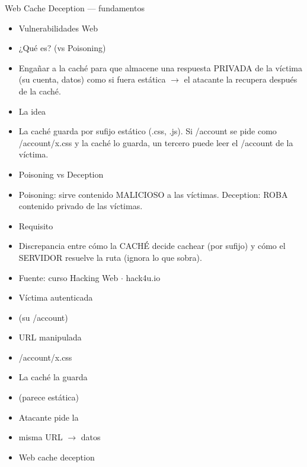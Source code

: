 \documentclass[aspectratio=169,10pt]{beamer}
\begin{document}
\begin{frame}[allowframebreaks]{Web Cache Deception --- fundamentos}
\small
  \begin{itemize}
  \item Vulnerabilidades Web
  \item ¿Qué es? (vs Poisoning)
  \item Engañar a la caché para que almacene una respuesta PRIVADA de la víctima (su cuenta, datos) como si fuera estática $\rightarrow$ el atacante la recupera después de la caché.
  \item La idea
  \item La caché guarda por sufijo estático (.css, .js). Si /account se pide como /account/x.css y la caché lo guarda, un tercero puede leer el /account de la víctima.
  \item Poisoning vs Deception
  \item Poisoning: sirve contenido MALICIOSO a las víctimas. Deception: ROBA contenido privado de las víctimas.
  \item Requisito
  \item Discrepancia entre cómo la CACHÉ decide cachear (por sufijo) y cómo el SERVIDOR resuelve la ruta (ignora lo que sobra).
  \item Fuente: curso Hacking Web $\cdot$ hack4u.io
  \item Víctima autenticada
  \item (su /account)
  \item URL manipulada
  \item /account/x.css
  \item La caché la guarda
  \item (parece estática)
  \item Atacante pide la
  \item misma URL $\rightarrow$ datos
  \item Web cache deception
  \end{itemize}
\end{frame}
\end{document}
